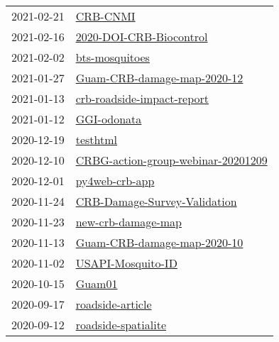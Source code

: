 \begin{longtable}{ll}
2021-02-21 &                                                         \href{https://github.com/aubreymoore/CRB-CNMI}{CRB-CNMI} \\
2021-02-16 &                           \href{https://github.com/aubreymoore/2020-DOI-CRB-Biocontrol}{2020-DOI-CRB-Biocontrol} \\
2021-02-02 &                                             \href{https://github.com/aubreymoore/bts-mosquitoes}{bts-mosquitoes} \\
2021-01-27 &                   \href{https://github.com/aubreymoore/Guam-CRB-damage-map-2020-12}{Guam-CRB-damage-map-2020-12} \\
2021-01-13 &                     \href{https://github.com/aubreymoore/crb-roadside-impact-report}{crb-roadside-impact-report} \\
2021-01-12 &                                                   \href{https://github.com/aubreymoore/GGI-odonata}{GGI-odonata} \\
2020-12-19 &                                                         \href{https://github.com/aubreymoore/testhtml}{testhtml} \\
2020-12-10 &     \href{https://github.com/aubreymoore/CRBG-action-group-webinar-20201209}{CRBG-action-group-webinar-20201209} \\
2020-12-01 &                                             \href{https://github.com/aubreymoore/py4web-crb-app}{py4web-crb-app} \\
2020-11-24 &                 \href{https://github.com/aubreymoore/CRB-Damage-Survey-Validation}{CRB-Damage-Survey-Validation} \\
2020-11-23 &                                     \href{https://github.com/aubreymoore/new-crb-damage-map}{new-crb-damage-map} \\
2020-11-13 &                   \href{https://github.com/aubreymoore/Guam-CRB-damage-map-2020-10}{Guam-CRB-damage-map-2020-10} \\
2020-11-02 &                                       \href{https://github.com/aubreymoore/USAPI-Mosquito-ID}{USAPI-Mosquito-ID} \\
2020-10-15 &                                                             \href{https://github.com/aubreymoore/Guam01}{Guam01} \\
2020-09-17 &                                         \href{https://github.com/aubreymoore/roadside-article}{roadside-article} \\
2020-09-12 &                                   \href{https://github.com/aubreymoore/roadside-spatialite}{roadside-spatialite} \\

\end{longtable}
